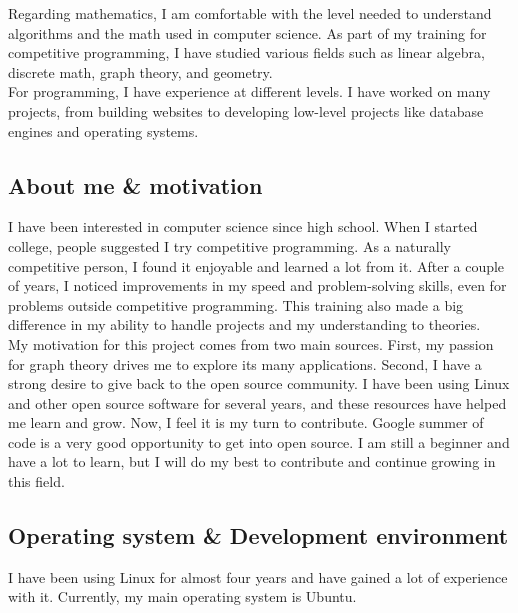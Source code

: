 Regarding mathematics, I am comfortable with the level needed to understand
algorithms and the math used in computer science. As part of my training for
competitive programming, I have studied various fields such as linear algebra,
discrete math, graph theory, and geometry.\\

For programming, I have experience at different levels. I have worked on many
projects, from building websites to developing low-level projects like database
engines and operating systems.\\


\subsection{About me \& motivation}
I have been interested in computer science since high school. When I started
college, people suggested I try competitive programming. As a naturally
competitive person, I found it enjoyable and learned a lot from it. After a
couple of years, I noticed improvements in my speed and problem-solving skills,
even for problems outside competitive programming. This training also made a
big difference in my ability to handle projects and my understanding to
theories. \\

My motivation for this project comes from two main sources. First, my passion
for graph theory drives me to explore its many applications. Second, I have a
strong desire to give back to the open source community. I have been using
Linux and other open source software for several years, and these resources
have helped me learn and grow. Now, I feel it is my turn to contribute. Google
summer of code is a very good opportunity to get into open source. I am still a
beginner and have a lot to learn, but I will do my best to contribute and
continue growing in this field.\\

\subsection{Operating system \& Development environment}
I have been using Linux for almost four years and have gained a lot of
experience with it. Currently, my main operating system is Ubuntu.\\

